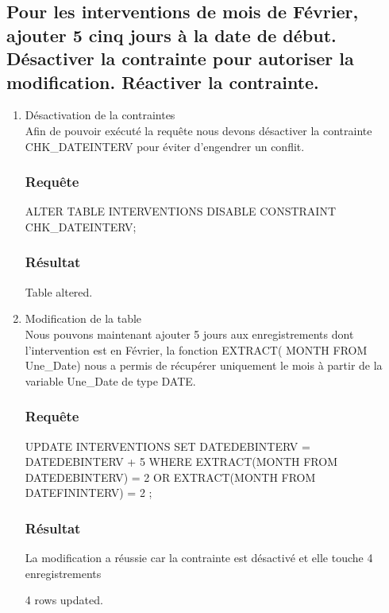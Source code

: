 \documentclass[•]{article}
\begin{document}
\subsection{Pour les interventions de mois de Février, ajouter 5 cinq jours à la date de début. Désactiver la contrainte pour autoriser la modification. Réactiver la contrainte.}
\begin{enumerate}
    \item Désactivation de la contraintes 
    \\
    Afin de pouvoir exécuté la requête nous devons désactiver la contrainte CHK\_DATEINTERV pour éviter d'engendrer un conflit. 
  
    \subsubsection{Requête}
    \begin{sql}
    ALTER TABLE INTERVENTIONS DISABLE CONSTRAINT CHK_DATEINTERV;
    \end{sql}
    \subsubsection{Résultat}
    \begin{sql}
    Table altered.
    \end{sql}
    \item Modification de la table
    \\
    Nous pouvons maintenant ajouter 5 jours aux enregistrements dont l'intervention est en Février, la fonction EXTRACT( MONTH FROM Une\_Date) nous a permis de récupérer uniquement le mois à partir de la variable Une\_Date de type DATE.
    
    \subsubsection{Requête}
    \begin{sql}
    UPDATE INTERVENTIONS SET DATEDEBINTERV =  DATEDEBINTERV + 5 WHERE EXTRACT(MONTH FROM DATEDEBINTERV) = 2 OR EXTRACT(MONTH FROM DATEFININTERV) = 2 ;
    \end{sql}
    \subsubsection{Résultat}
    \textrm{La modification a réussie car la contrainte est désactivé et elle touche 4 enregistrements}
    \begin{sql}
    4 rows updated.
    \end{sql}
    

\end{enumerate}
\end{document}
